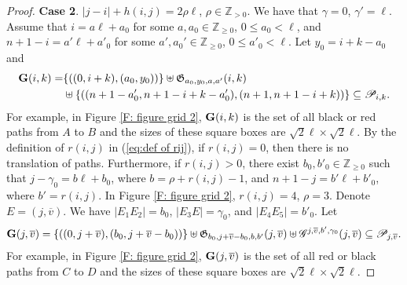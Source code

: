 \documentclass[12pt, reqno]{amsart}
\numberwithin{equation}{section}
\newcommand{\ZZ}{\mathbb{Z}}
\begin{document}
{\begin{proof}
\textbf{Case 2}. $|j-i|+h(i,j)= 2\rho \ell$, $\rho \in \ZZ_{>0}$. We have that $\gamma=0$, $\gamma'=\ell$. Assume that $i=a \ell+a_0$ for some $a, a_0\in \mathbb{Z}_{\geq 0}$, $0\leq a_0< \ell$, and $n+1-i=a' \ell+a'_0$ for some $a', a_0'\in \mathbb{Z}_{\geq 0}$, $0\leq a'_0< \ell$. Let $y_0=i+k-a_0$ and
\begin{align*}
{\bf G}(i,k)=&\{((0,i+k),(a_0,y_0))\}\uplus \mathfrak{G}_{a_0,y_0,a, a'}(i,k)\\
&\uplus \{((n+1-a'_0, n+1-i+k-a'_0),(n+1,n+1-i+k))\} \subseteq \mathscr{P}_{i, k}.
\end{align*}
For example, in Figure \ref{F: figure grid 2}, ${\bf G}(i,k)$ is the set of all black or red paths from $A$ to $B$ and the sizes of these square boxes are $\sqrt{2}\ell\times \sqrt{2}\ell$. By the definition of $r(i,j)$ in (\ref{eq:def of rij}), if $r(i,j)=0$, then there is no translation of paths. Furthermore, if $r(i, j) > 0$, there exist $b_0, b'_0\in \mathbb{Z}_{\geq 0}$ such that $j-\gamma_0=b \ell+b_0$, where $b=\rho+r(i,j)-1$, and $n+1-j=b' \ell+b'_0$, where $b'=r(i,j)$. In Figure \ref{F: figure grid 2}, $r(i,j)=4$, $\rho=3$. Denote $E=(j,\overline{v})$. We have $|E_1E_2|=b_0$, $|E_3E|=\gamma_0$, and $|E_4E_5|=b'_0$. Let
\begin{align*}
{\bf G}(j,\overline{v})=\{((0,j+\overline{v}),(b_0,j+\overline{v}-b_0))\}\uplus\mathfrak{G}_{b_0,j+\overline{v}-b_0, b, b'}(j,\overline{v})\uplus \mathscr{G}^{j, \overline{v}, b', \gamma_0 }(j,\overline{v})
\subseteq \mathscr{P}_{j, \overline{v}}.
\end{align*}
For example, in Figure \ref{F: figure grid 2}, ${\bf G}(j,\overline{v})$ is the set of all red or black paths from $C$ to $D$ and the sizes of these square boxes are $\sqrt{2}\ell\times \sqrt{2}\ell$.



\end{proof}}
\end{document}
